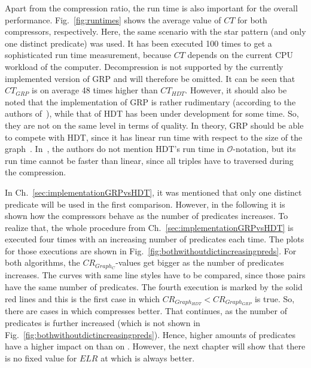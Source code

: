 Apart from the compression ratio, the run time is also important for the overall performance. Fig.~\ref{fig:runtimes} shows the average value of $CT$ for both compressors, respectively. Here, the same scenario with the star pattern (and only one distinct predicate) was used. It has been executed 100 times to get a sophisticated run time measurement, because $CT$ depends on the current CPU workload of the computer. Decompression is not supported by the currently implemented version of GRP and will therefore be omitted. It can be seen that $CT_{GRP}$ is on average 48 times higher than $CT_{HDT}$. However, it should also be noted that the implementation of GRP is rather rudimentary  (according to the authors of~\cite{maneth}), while that of HDT has been under development for some time. So, they are not on the same level in terms of quality. In theory, GRP should be able to compete with HDT, since it has linear run time with respect to the size of the graph~\cite{maneth}. In~\cite{hdt}, the authors do not mention HDT's run time in $\mathcal{O}$-notation, but its run time cannot be faster than linear, since all triples have to traversed during the compression.
\FloatBarrier

In Ch.~\ref{sec:implementationGRPvsHDT}, it was mentioned that only one distinct predicate will be used in the first comparison. However, in the following it is shown how the compressors behave as the number of predicates increases. To realize that, the whole procedure from Ch.~\ref{sec:implementationGRPvsHDT} is executed  four times with an increasing number of predicates each time. The plots for those executions are shown in Fig.~\ref{fig:bothwithoutdictincreasingpreds}. For both algorithms, the $CR_{Graph_C}$-values get bigger as the number of predicates increases. The curves with same line styles have to be compared, since those pairs have the same number of predicates. The fourth execution is marked by the solid red lines and this is the first case in which $CR_{Graph_{HDT}} <CR_{Graph_{GRP}} $ is true. So, there are cases in which \GHDT{} compresses better. That continues, as the number of predicates is further increased (which is not shown in Fig.~\ref{fig:bothwithoutdictincreasingpreds}). Hence, higher amounts of predicates have a higher impact on \GGRP{} than on \GHDT{}. However, the next chapter will show that there is no fixed value for $ELR$ at which \GHDT{} is always better.

